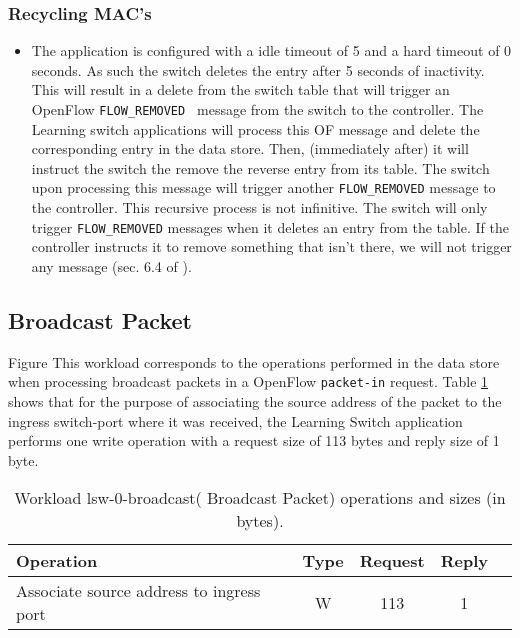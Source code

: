 \subsubsection{Recycling MAC's}
\begin{itemize}
\item The application is configured with a idle timeout of 5 and a hard timeout of 0 seconds. As such the switch deletes the entry after 5 seconds of inactivity. This will result in a delete from the switch table that will trigger an OpenFlow \texttt{FLOW\_REMOVED } message from the switch to the controller. The Learning switch applications will process this OF message and delete the corresponding entry in the data store. Then, (immediately after) it will instruct the switch the remove the reverse entry from its table. The switch upon processing this message will trigger another \texttt{FLOW\_REMOVED} message to the controller.  This recursive process is not infinitive. The switch will only trigger \texttt{FLOW\_REMOVED} messages when it deletes an entry from the table. If the controller instructs it to remove something that isn't there, we will not trigger any message (sec. 6.4 of \cite{openflow-spec}). 
\end{itemize}

\subsection{Broadcast Packet}
Figure                \label{fig:ls:interaction:broadcast}
This workload corresponds to the operations performed in the data
store when processing broadcast packets in a OpenFlow
\texttt{packet-in} request.  Table \ref{table:lsw0:broadcast} shows that for the
purpose of associating the source address of the packet to the ingress
switch-port where it was received, the Learning Switch application performs one
write operation with a request size of 113 bytes and reply size of 1
byte. 

\begin{table}[ht]
\centering 
\begin{tabular}{l c c c c}
 Operation & Type & Request & Reply \\ \toprule 
 Associate source address to ingress port & W & 113 & 1 \\ \bottomrule
\end{tabular}
\caption[Workload lsw-0-broadcast( Broadcast Packet) operations]{Workload lsw-0-broadcast( Broadcast Packet) operations and sizes (in bytes).}
\label{table:lsw0:broadcast}
\end{table}

